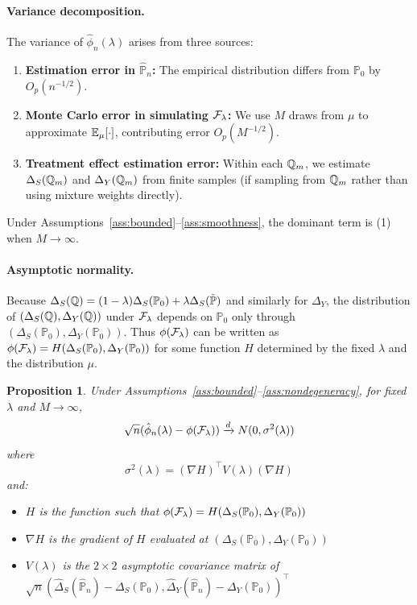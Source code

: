 \documentclass{article}
\newtheorem{proposition}{Proposition}
\newcommand{\PP}{\mathbb{P}}
\begin{document}
\paragraph{Variance decomposition.}
The variance of $\hat{\phi}_n(\lambda)$ arises from three sources:
\begin{enumerate}
    \item \textbf{Estimation error in $\hat{\PP}_n$:} The empirical distribution
          differs from $\PP_0$ by $O_p(n^{-1/2})$.
    \item \textbf{Monte Carlo error in simulating $\mathcal{F}_\lambda$:} We use $M$ draws
          from $\mu$ to approximate $\mathbb{E}_\mu[\cdot]$, contributing error $O_p(M^{-1/2})$.
    \item \textbf{Treatment effect estimation error:} Within each $\mathbb{Q}_m$, we estimate
          $\Delta_S(\mathbb{Q}_m)$ and $\Delta_Y(\mathbb{Q}_m)$ from finite samples (if sampling
          from $\mathbb{Q}_m$ rather than using mixture weights directly).
\end{enumerate}

Under Assumptions~\ref{ass:bounded}--\ref{ass:smoothness}, the dominant term is
(1) when $M \to \infty$.

\paragraph{Asymptotic normality.}
Because $\Delta_S(\Q) = (1-\lambda)\Delta_S(\PP_0) + \lambda\Delta_S(\tilde{\PP})$ and similarly for $\Delta_Y$, the distribution of $(\Delta_S(\mathbb{Q}), \Delta_Y(\mathbb{Q}))$ under $\mathcal{F}_\lambda$ depends on $\PP_0$ only through $(\Delta_S(\PP_0), \Delta_Y(\PP_0))$. Thus $\phi(\mathcal{F}_\lambda)$ can be written as $\phi(\cF_\lambda) = H(\Delta_S(\PP_0), \Delta_Y(\PP_0))$ for some function $H$ determined by the fixed $\lambda$ and the distribution $\mu$.

\begin{proposition}\label{prop:asymptotic}
Under Assumptions~\ref{ass:bounded}--\ref{ass:nondegeneracy}, for fixed $\lambda$
and $M \to \infty$,
\[
    \sqrt{n}(\hat{\phi}_n(\lambda) - \phi(\mathcal{F}_\lambda))
    \xrightarrow{d} N(0, \sigma^2(\lambda))
\]
where
\[
    \sigma^2(\lambda) = (\nabla H)^\top V(\lambda) (\nabla H)
\]
and:
\begin{itemize}
    \item $H$ is the function such that $\phi(\cF_\lambda) = H(\Delta_S(\PP_0), \Delta_Y(\PP_0))$
    \item $\nabla H$ is the gradient of $H$ evaluated at $(\Delta_S(\PP_0), \Delta_Y(\PP_0))$
    \item $V(\lambda)$ is the $2 \times 2$ asymptotic covariance matrix of
          $\sqrt{n}(\hat{\Delta}_S(\hat{\PP}_n) - \Delta_S(\PP_0),
                    \hat{\Delta}_Y(\hat{\PP}_n) - \Delta_Y(\PP_0))^\top$
\end{itemize}
\end{proposition}
\end{document}
